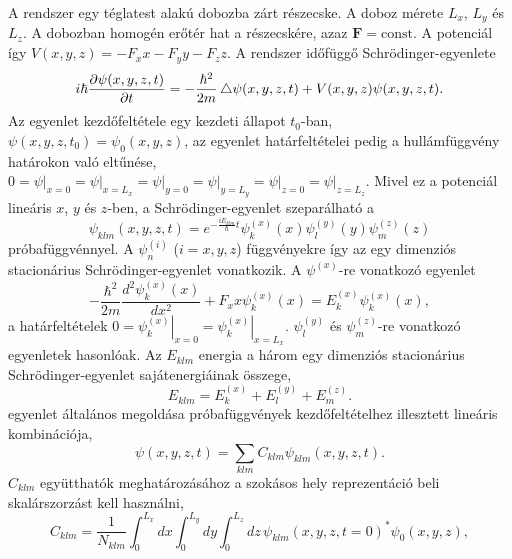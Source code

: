 A rendszer egy téglatest alakú dobozba zárt részecske. A doboz mérete $L_x$, $L_y$ és $L_z$. A dobozban homogén erőtér hat a részecskére, azaz $\boldsymbol{F} = \text{const}$. A potenciál így $V(x, y, z) = -F_xx-F_yy-F_zz$. A rendszer időfüggő Schrödinger-egyenlete
\begin{equation}
	i\hbar\frac{\partial \psi(x, y, z, t)}{\partial t} = -\frac{\hbar^2}{2m} \mathop{}\!\mathbin\bigtriangleup \psi(x, y, z, t) + V(x, y, z)\psi(x, y, z, t).
	\label{3dbox:3dscheq}
\end{equation}
Az egyenlet kezdőfeltétele egy kezdeti állapot $t_0$-ban, $\psi(x, y, z, t_0) = \psi_0(x, y, z)$, az egyenlet határfeltételei pedig a hullámfüggvény határokon való eltűnése, $0=\left.\psi\right|_{x=0}=\left.\psi\right|_{x=L_x}=\left.\psi\right|_{y=0}=\left.\psi\right|_{y=L_y}=\left.\psi\right|_{z=0}=\left.\psi\right|_{z=L_z}$. Mivel ez a potenciál lineáris $x$, $y$ és $z$-ben, a Schrödinger-egyenlet szeparálható a
\begin{equation}
	\psi_{klm}(x, y, z, t) = e^{-\frac{iE_{klm}}{\hbar}t}\psi^{(x)}_k(x)\psi^{(y)}_l(y)\psi^{(z)}_m(z)
	\label{3dox:3dansatz}
\end{equation}
próbafüggvénnyel. A $\psi^{(i)}_n$ ($i=x, y, z$) függvényekre így az egy dimenziós stacionárius Schrödinger-egyenlet vonatkozik. A $\psi^{(x)}$-re vonatkozó egyenlet 
\begin{equation}
	-\frac{\hbar^2}{2m}\frac{d^2\psi^{(x)}_k(x)}{dx^2} + F_xx\psi^{(x)}_k(x) = E^{(x)}_k\psi^{(x)}_k(x),
	\label{3dbox:1deq}
\end{equation}
a határfeltételek $0=\left.\psi^{(x)}_k\right|_{x=0}=\left.\psi^{(x)}_k\right|_{x=L_x}$. $\psi^{(y)}_l$ és $\psi^{(z)}_m$-re vonatkozó egyenletek hasonlóak. Az $E_{klm}$ energia a három egy dimenziós stacionárius Schrödinger-egyenlet sajátenergiáinak összege,
\begin{equation}
	E_{klm} = E^{(x)}_k+E^{(y)}_l+E^{(z)}_m.
\end{equation}
 egyenlet általános megoldása  próbafüggvények kezdőfeltételhez illesztett lineáris kombinációja,
\begin{equation}
	\psi(x,y,z,t) = \sum_{klm}C_{klm}\psi_{klm}(x,y,z,t).
\end{equation}
$C_{klm}$ együtthatók meghatározásához a szokásos hely reprezentáció beli skalárszorzást kell használni,
\begin{equation}
	C_{klm} = \frac{1}{N_{klm}}\int_0^{L_x}dx\int_0^{L_y}dy\int_0^{L_z}dz\,\psi_{klm}(x, y, z, t=0)^*\psi_0(x, y, z),
	\label{3dbox:ceq}
\end{equation}

